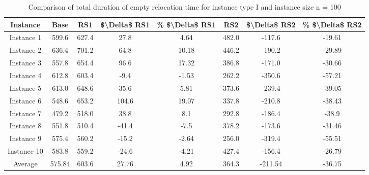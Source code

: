 \begin{table}[H]
\centering
\begin{tabular}{cccccccc}
  \hline
  \textbf{Instance} & \textbf{Base} & \textbf{RS1} & \textbf{\$\textbackslash{}Delta\$  RS1} & \textbf{\% \$\textbackslash{}Delta\$  RS1} & \textbf{RS2} & \textbf{\$\textbackslash{}Delta\$  RS2} & \textbf{\% \$\textbackslash{}Delta\$  RS2} \\\hline
  Instance 1 & 599.6 & 627.4 & 27.8 & 4.64 & 482.0 & -117.6 & -19.61 \\
  Instance 2 & 636.4 & 701.2 & 64.8 & 10.18 & 446.2 & -190.2 & -29.89 \\
  Instance 3 & 557.8 & 654.4 & 96.6 & 17.32 & 386.8 & -171.0 & -30.66 \\
  Instance 4 & 612.8 & 603.4 & -9.4 & -1.53 & 262.2 & -350.6 & -57.21 \\
  Instance 5 & 613.0 & 648.6 & 35.6 & 5.81 & 373.6 & -239.4 & -39.05 \\
  Instance 6 & 548.6 & 653.2 & 104.6 & 19.07 & 337.8 & -210.8 & -38.43 \\
  Instance 7 & 479.2 & 518.0 & 38.8 & 8.1 & 292.8 & -186.4 & -38.9 \\
  Instance 8 & 551.8 & 510.4 & -41.4 & -7.5 & 378.2 & -173.6 & -31.46 \\
  Instance 9 & 575.4 & 560.2 & -15.2 & -2.64 & 256.0 & -319.4 & -55.51 \\
  Instance 10 & 583.8 & 559.2 & -24.6 & -4.21 & 427.4 & -156.4 & -26.79 \\
  Average & 575.84 & 603.6 & 27.76 & 4.92 & 364.3 & -211.54 & -36.75 \\\hline
\end{tabular}
\caption{Comparison of total duration of empty relocation time for instance type I and instance size n = 100}
\label{tab:wait:resrelocation-empty-relocation-comparison_I_100}
\end{table}
